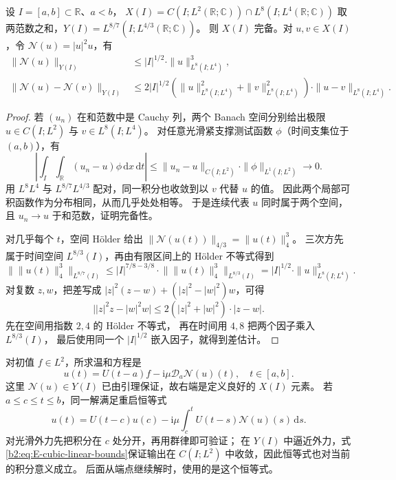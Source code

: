 \begin{lemma}[三次项的解空间估计]\label{b2:lem:E-cubic-space}
设 \(I=[a,b]\subset\mathbb R\)、\(a<b\)，
\(X(I)=C(I;L^2(\mathbb R;\mathbb C))\cap L^8(I;L^4(\mathbb R;\mathbb C))\)
取两范数之和，\(Y(I)=L^{8/7}(I;L^{4/3}(\mathbb R;\mathbb C))\)。
则 \(X(I)\) 完备。对 \(u,v\in X(I)\)，令 \(\mathcal N(u)=|u|^2u\)，有
\begin{equation}\label{b2:eq:E-cubic-nonlinear-bounds}
 \begin{aligned}
 \|\mathcal N(u)\|_{Y(I)}
 &\le |I|^{1/2}\cdot\|u\|_{L^8(I;L^4)}^3,\\
 \|\mathcal N(u)-\mathcal N(v)\|_{Y(I)}
 &\le 2|I|^{1/2}
    \left(\|u\|_{L^8(I;L^4)}^2+\|v\|_{L^8(I;L^4)}^2\right)
    \cdot\|u-v\|_{L^8(I;L^4)}.
 \end{aligned}
\end{equation}
\end{lemma}
\begin{proof}
若 \((u_n)\) 在和范数中是 Cauchy 列，两个 Banach 空间分别给出极限
\(u\in C(I;L^2)\) 与 \(v\in L^8(I;L^4)\)。
对任意光滑紧支撑测试函数 \(\phi\)（时间支集位于 \((a,b)\)），有
\[
 \left|\int_I\int_{\mathbb R}(u_n-u)\phi\,\mathrm dx\,\mathrm dt\right|
 \le\|u_n-u\|_{C(I;L^2)}\cdot\|\phi\|_{L^1(I;L^2)}\longrightarrow0.
\]
用 \(L^8L^4\) 与 \(L^{8/7}L^{4/3}\) 配对，同一积分也收敛到以 \(v\) 代替 \(u\) 的值。
因此两个局部可积函数作为分布相同，从而几乎处处相等。
于是连续代表 \(u\) 同时属于两个空间，且 \(u_n\to u\) 于和范数，证明完备性。

对几乎每个 \(t\)，空间 Hölder 给出
\(\|\mathcal N(u(t))\|_{4/3}=\|u(t)\|_4^3\)。
三次方先属于时间空间 \(L^{8/3}(I)\)，再由有限区间上的 Hölder 不等式得到
\[
 \bigl\|\|u(t)\|_4^3\bigr\|_{L^{8/7}(I)}
 \le |I|^{7/8-3/8}\cdot
       \bigl\|\|u(t)\|_4^3\bigr\|_{L^{8/3}(I)}
 =|I|^{1/2}\cdot\|u\|_{L^8(I;L^4)}^3.
\]
对复数 \(z,w\)，把差写成
\(|z|^2(z-w)+(|z|^2-|w|^2)w\)，可得
\[
 \bigl||z|^2z-|w|^2w\bigr|
 \le2(|z|^2+|w|^2)\cdot|z-w|.
\]
先在空间用指数 \(2,4\) 的 Hölder 不等式，
再在时间用 \(4,8\) 把两个因子乘入 \(L^{8/3}(I)\)，
最后使用同一个 \(|I|^{1/2}\) 嵌入因子，就得到差估计。
\end{proof}

对初值 \(f\in L^2\)，所求温和方程是
\begin{equation}\label{b2:eq:E-cubic-mild}
 u(t)=U(t-a)f-\mathrm i\mu\mathcal D_a\mathcal N(u)(t),
 \quad t\in[a,b].
\end{equation}
这里 \(\mathcal N(u)\in Y(I)\) 已由引理保证，故右端是定义良好的 \(X(I)\) 元素。
若 \(a\le c\le t\le b\)，同一解满足重启恒等式
\begin{equation}\label{b2:eq:E-cubic-restart}
 u(t)=U(t-c)u(c)-\mathrm i\mu\int_c^tU(t-s)\mathcal N(u)(s)\,\mathrm ds.
\end{equation}
对光滑外力先把积分在 \(c\) 处分开，再用群律即可验证；
在 \(Y(I)\) 中逼近外力，式\eqref{b2:eq:E-cubic-linear-bounds}保证输出在
\(C(I;L^2)\) 中收敛，因此恒等式也对当前的积分意义成立。
后面从端点继续解时，使用的是这个恒等式。

